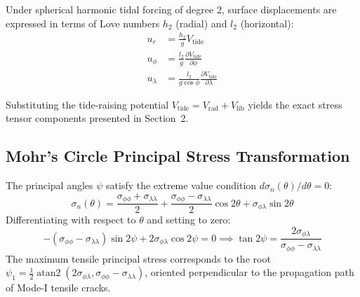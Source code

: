 \documentclass[11pt,a4paper]{article}
\begin{document}
Under spherical harmonic tidal forcing of degree 2, surface displacements are expressed in terms of Love numbers $h_2$ (radial) and $l_2$ (horizontal):
\begin{align}
u_r &= \frac{h_2}{g} V_{\text{tide}} \\
u_\phi &= \frac{l_2}{g} \frac{\partial V_{\text{tide}}}{\partial \phi} \\
u_\lambda &= \frac{l_2}{g \cos\phi} \frac{\partial V_{\text{tide}}}{\partial \lambda}
\end{align}

Substituting the tide-raising potential $V_{\text{tide}} = V_{\text{rad}} + V_{\text{lib}}$ yields the exact stress tensor components presented in Section~2.

\subsection{Mohr's Circle Principal Stress Transformation}
The principal angles $\psi$ satisfy the extreme value condition $d\sigma_n(\theta)/d\theta = 0$:
\begin{equation}
\sigma_n(\theta) = \frac{\sigma_{\phi\phi} + \sigma_{\lambda\lambda}}{2} + \frac{\sigma_{\phi\phi} - \sigma_{\lambda\lambda}}{2} \cos 2\theta + \sigma_{\phi\lambda} \sin 2\theta
\end{equation}
Differentiating with respect to $\theta$ and setting to zero:
\begin{equation}
-(\sigma_{\phi\phi} - \sigma_{\lambda\lambda}) \sin 2\psi + 2\sigma_{\phi\lambda} \cos 2\psi = 0 \implies \tan 2\psi = \frac{2\sigma_{\phi\lambda}}{\sigma_{\phi\phi} - \sigma_{\lambda\lambda}}
\end{equation}
The maximum tensile principal stress corresponds to the root $\psi_1 = \frac{1}{2}\operatorname{atan2}(2\sigma_{\phi\lambda}, \sigma_{\phi\phi} - \sigma_{\lambda\lambda})$, oriented perpendicular to the propagation path of Mode-I tensile cracks.
\end{document}
